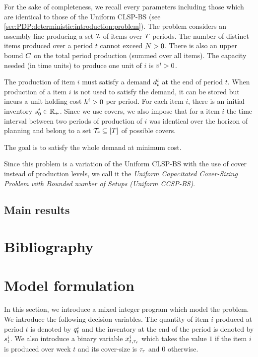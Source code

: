 For the sake of completeness, we recall every parameters including those which are identical to those of the Uniform CLSP-BS (see \cref{sec:PDP:deterministic:introduction:problem}).
The problem considers an assembly line producing a set $\mathcal{I}$ of items over $T$ periods.
The number of distinct items produced over a period $t$ cannot exceed $N>0$.
There is also an upper bound $C$ on the total period production (summed over all items).
The capacity needed (in time units) to produce one unit of $i$ is $v^i>0$.


The production of item $i$ must satisfy a demand $d_t^i$ at the end of period $t$.
When production of a item $i$ is not used to satisfy the demand, it can be stored but incurs a unit holding cost $h^i>0$ per period.
For each item $i$, there is an initial inventory $s_0^i\in\mathbb{R}_+$.
Since we use covers, we also impose that for a item $i$ the time interval between two periods of production of $i$ was identical over the horizon of planning and belong to a set $\coverset_r\subseteq\range{\horizon}$ of possible covers.


The goal is to satisfy the whole demand at minimum cost.


Since this problem is a variation of the Uniform CLSP-BS with the use of cover instead of production levels, we call it the \emph{Uniform Capacitated Cover-Sizing Problem with Bounded number of Setups (Uniform CCSP-BS)}.



\subsection{Main results}



\section{Bibliography}


\section{Model formulation}


In this section, we introduce a mixed integer program which model the problem.
We introduce the following decision variables.
The quantity of item $i$ produced at period $t$ is denoted by $q_t^i$ and the inventory at the end of the period is denoted by $s_t^i$. We also introduce a binary variable $x_{t,\tau_r}^i$ which takes the value $1$ if the item $i$ is produced over week $t$ and its cover-size is $\tau_r$ and $0$ otherwise.


